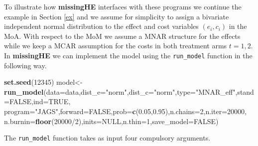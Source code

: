 \documentclass[]{article}
\newenvironment{Shaded}{\begin{snugshade}}{\end{snugshade}}
\newcommand{\KeywordTok}[1]{\textcolor[rgb]{0.13,0.29,0.53}{\textbf{{#1}}}}
\newcommand{\DataTypeTok}[1]{\textcolor[rgb]{0.13,0.29,0.53}{{#1}}}
\newcommand{\DecValTok}[1]{\textcolor[rgb]{0.00,0.00,0.81}{{#1}}}
\newcommand{\FloatTok}[1]{\textcolor[rgb]{0.00,0.00,0.81}{{#1}}}
\newcommand{\StringTok}[1]{\textcolor[rgb]{0.31,0.60,0.02}{{#1}}}
\newcommand{\OtherTok}[1]{\textcolor[rgb]{0.56,0.35,0.01}{{#1}}}
\newcommand{\NormalTok}[1]{{#1}}
\begin{document}
To illustrate how \textbf{missingHE} interfaces with these programs we
continue the example in Section \ref{ex} and we assume for simplicity to
assign a bivariate independent normal distribution to the effect and
cost variables \((e_{i},c_{i})\) in the MoA. With respect to the MoM we
assume a MNAR structure for the effects while we keep a MCAR assumption
for the costs in both treatment arms \(t=1,2\). In \textbf{missingHE} we
can implement the model using the \texttt{run\_model} function in the
following way.

\begin{Shaded}
\begin{Highlighting}[]
\KeywordTok{set.seed}\NormalTok{(}\DecValTok{12345}\NormalTok{)}
\NormalTok{model<-}\KeywordTok{run_model}\NormalTok{(}\DataTypeTok{data=}\NormalTok{data,}\DataTypeTok{dist_e=}\StringTok{"norm"}\NormalTok{,}\DataTypeTok{dist_c=}\StringTok{"norm"}\NormalTok{,}\DataTypeTok{type=}\StringTok{"MNAR_eff"}\NormalTok{,}\DataTypeTok{stand=}\OtherTok{FALSE}\NormalTok{,}\DataTypeTok{ind=}\OtherTok{TRUE}\NormalTok{,}
                 \DataTypeTok{program=}\StringTok{"JAGS"}\NormalTok{,}\DataTypeTok{forward=}\OtherTok{FALSE}\NormalTok{,}\DataTypeTok{prob=}\KeywordTok{c}\NormalTok{(}\FloatTok{0.05}\NormalTok{,}\FloatTok{0.95}\NormalTok{),}\DataTypeTok{n.chains=}\DecValTok{2}\NormalTok{,}\DataTypeTok{n.iter=}\DecValTok{20000}\NormalTok{,}
                 \DataTypeTok{n.burnin=}\KeywordTok{floor}\NormalTok{(}\DecValTok{20000}\NormalTok{/}\DecValTok{2}\NormalTok{),}\DataTypeTok{inits=}\OtherTok{NULL}\NormalTok{,}\DataTypeTok{n.thin=}\DecValTok{1}\NormalTok{,}\DataTypeTok{save_model=}\OtherTok{FALSE}\NormalTok{)}
\end{Highlighting}
\end{Shaded}

The \texttt{run\_model} function takes as input four compulsory
arguments.
\end{document}
